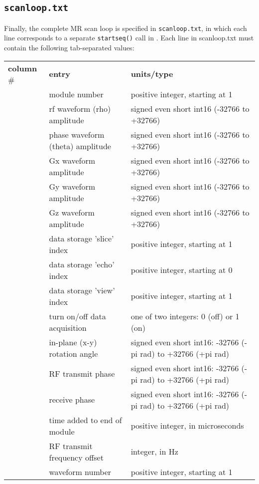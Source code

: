\subsection{\tt scanloop.txt}
Finally, the complete MR scan loop is specified in {\tt scanloop.txt}, in which each line corresponds to a separate {\tt startseq()} call in \toppe.
Each line in scanloop.txt must contain the following tab-separated values:

\begin{tabular}{ l l l}
  \textbf{column} \# & \textbf{entry} & \textbf{units/type} \\
  \modulenum	& module number 								& positive integer, starting at 1 \\
  \rfamp    	& rf waveform (rho) amplitude				& signed even short int16 (-32766 to +32766) \\
  \thetaamp 	& phase waveform (theta) amplitude		& signed even short int16 (-32766 to +32766) \\
  \gxamp			& Gx waveform amplitude						& signed even short int16 (-32766 to +32766) \\
  \gyamp			& Gy waveform amplitude						& signed even short int16 (-32766 to +32766) \\
  \gzamp			& Gz waveform amplitude						& signed even short int16 (-32766 to +32766) \\
  \dabslice		& data storage 'slice' index				& positive integer, starting at 1 \\ 
  \dabecho		& data storage 'echo' index				& positive integer, starting at 0 \\ 
  \dabview		& data storage 'view' index				& positive integer, starting at 1 \\ 
  \dabmode		& turn on/off data acquisition			& one of two integers: 0 (off) or 1 (on) \\
  \inplanerot	& in-plane (x-y) rotation angle			& signed even short int16: -32766 (-pi rad) to +32766 (+pi rad) \\
  \txphase		& RF transmit phase							& signed even short int16: -32766 (-pi rad) to +32766 (+pi rad) \\
  \recphase		& receive phase								& signed even short int16: -32766 (-pi rad) to +32766 (+pi rad) \\
  \textra		& time added to end of module				& positive integer, in microseconds \\
  \rffreq		& RF transmit frequency offset			& integer, in Hz \\
  \waveformnum	& waveform number 							& positive integer, starting at 1
\end{tabular} \\ [0.2in]

